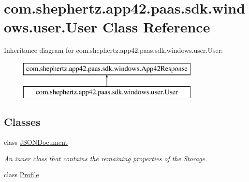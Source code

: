 \hypertarget{classcom_1_1shephertz_1_1app42_1_1paas_1_1sdk_1_1windows_1_1user_1_1_user}{\section{com.\+shephertz.\+app42.\+paas.\+sdk.\+windows.\+user.\+User Class Reference}
\label{classcom_1_1shephertz_1_1app42_1_1paas_1_1sdk_1_1windows_1_1user_1_1_user}
}
Inheritance diagram for com.\+shephertz.\+app42.\+paas.\+sdk.\+windows.\+user.\+User\+:\begin{figure}[H]
\begin{center}
\leavevmode
\includegraphics[height=2.000000cm]{classcom_1_1shephertz_1_1app42_1_1paas_1_1sdk_1_1windows_1_1user_1_1_user}
\end{center}
\end{figure}
\subsection*{Classes}
\begin{DoxyCompactItemize}
\item 
class \hyperlink{classcom_1_1shephertz_1_1app42_1_1paas_1_1sdk_1_1windows_1_1user_1_1_user_1_1_j_s_o_n_document}{J\+S\+O\+N\+Document}
\begin{DoxyCompactList}\small\item\em An inner class that contains the remaining properties of the Storage. \end{DoxyCompactList}\item 
class \hyperlink{classcom_1_1shephertz_1_1app42_1_1paas_1_1sdk_1_1windows_1_1user_1_1_user_1_1_profile}{Profile}
\end{DoxyCompactItemize}
